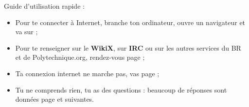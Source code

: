 
Guide d'utilisation rapide :
\begin{itemize}
\item Pour te connecter à Internet, branche ton ordinateur, ouvre un navigateur et va sur  ;
\item Pour te renseigner sur le \textbf{WikiX}, sur \textbf{IRC} ou sur les autres services du BR et de Polytechnique.org, rendez-vous page \pageref{services} ;
\item Ta connexion internet ne marche pas, vas page \pageref{diagnostic} ;
\item Tu ne comprends rien, tu as des questions : beaucoup de réponses sont données page \pageref{faq} et suivantes.

\end{itemize}
